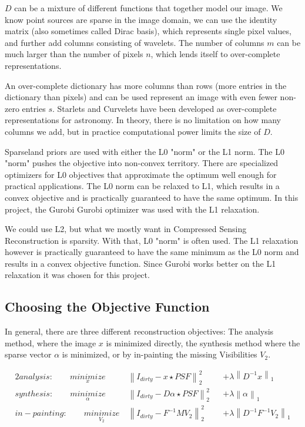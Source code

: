 $D$ can be a mixture of different functions that together model our image. We know point sources are sparse in the image domain, we can use the identity matrix (also sometimes called Dirac basis), which represents single pixel values, and further add columns consisting of wavelets. The number of columns $m$ can be much larger than the number of pixels $n$, which lends itself to over-complete representations.

An over-complete dictionary has more columns than rows (more entries in the dictionary than pixels) and can be used represent an image with even fewer non-zero entries $s$. Starlets\cite{starck2015starlet} and Curvelets\cite{starck2003astronomical} have been developed as over-complete representations for astronomy. In theory, there is no limitation on how many columns we add, but in practice computational power limits the size of $D$.

Sparseland priors are used with either the L0 "norm" or the L1 norm. The L0 "norm" pushes the objective into non-convex territory. There are specialized optimizers for L0 objectives that approximate the optimum well enough for practical applications. The L0 norm can be relaxed to L1, which results in a convex objective and is practically guaranteed to have the same optimum. In this project, the Gurobi Gurobi\cite{gurobi2018optimizer} optimizer was used with the L1 relaxation.

We could use L2, but what we mostly want in Compressed Sensing Reconstruction is sparsity. 
With that, L0 "norm" is often used. 
The L1 relaxation however is practically guaranteed to have the same minimum as the L0 norm and results in a convex objective function. Since Gurobi works better on the L1 relaxation it was chosen for this project.


\subsection{Choosing the Objective Function} \label{cs:objective}
In general, there are three different reconstruction objectives: The analysis method, where the image $x$ is minimized directly, the synthesis method where the sparse vector $\alpha$ is minimized, or by in-painting the missing Visibilities $V_2$.

\begin{alignat*}{2}
analysis:\qquad \underset{x}{minimize} \:& \left \| I_{dirty} - x \star PSF \right \|_2^2 &&+  \lambda \left \| D^{-1}x \right \|_1 \\
synthesis:\qquad \underset{\alpha}{minimize} \:& \left \| I_{dirty} - D \alpha \star PSF \right \|_2^2 &&+ \lambda \left \| \alpha \right \|_1 \\
in-painting:\qquad \underset{V_2}{minimize} \:& \left \|  I_{dirty} - F^{-1} M V_2 \right \|_2^2 &&+ \lambda \left \| D^{-1}F^{-1}V_2\right \|_1
\end{alignat*}

